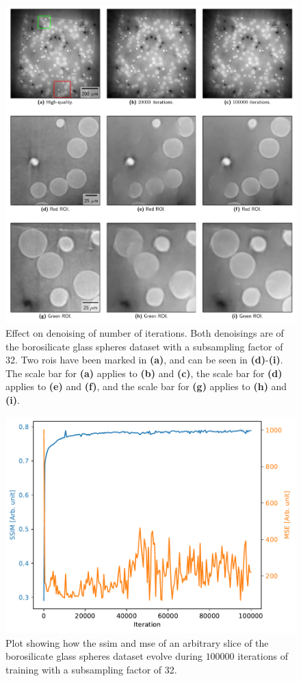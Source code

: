 \begin{figure}[htbp]
  \centering
  \includegraphics[width=.85\textwidth]{figures/iterationdenoisingcomparison.pdf}
  \caption[Effect on denoising of number of iterations]{Effect on denoising of number of iterations. Both denoisings are of the borosilicate glass spheres dataset with a subsampling factor of 32. Two \glspl{roi} have been marked in \textbf{(a)}, and can be seen in \textbf{(d)}-\textbf{(i)}. The scale bar for \textbf{(a)} applies to \textbf{(b)} and \textbf{(c)}, the scale bar for \textbf{(d)} applies to \textbf{(e)} and \textbf{(f)}, and the scale bar for \textbf{(g)} applies to \textbf{(h)} and \textbf{(i)}. }
  \label{fig:iterationdenoisingcomparison}
\end{figure}

\begin{figure}[htbp]
  \centering
  \includegraphics[width=.85\textwidth]{figures/ssimns32logcosh.pdf}
  \caption[SSIM and MSE evolution during training]{Plot showing how the \gls{ssim} and \gls{mse} of an arbitrary slice of the borosilicate glass spheres dataset evolve during $100000$ iterations of training with a subsampling factor of 32. }
  \label{fig:ssimmseevolution}
\end{figure}


